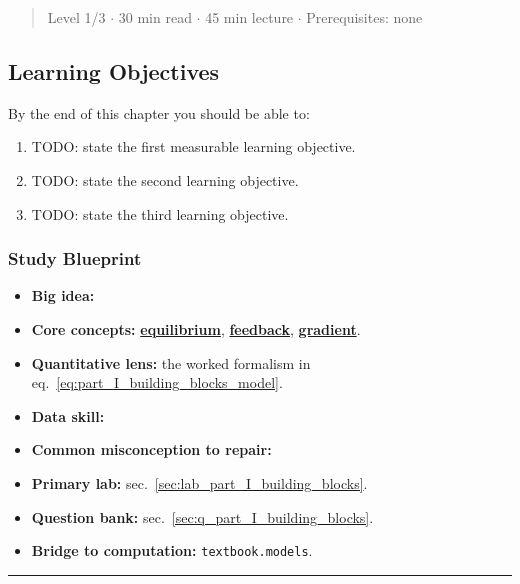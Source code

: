 \documentclass[
]{article}
\newcounter{none} %
\providecommand{\tightlist}{%
  \setlength{\itemsep}{0pt}\setlength{\parskip}{0pt}}
\theoremstyle{plain}
\theoremstyle{definition}
\begin{document}
\begin{quote}
Level 1/3 \texorpdfstring{\ensuremath{\cdot}}{.} 30 min read \texorpdfstring{\ensuremath{\cdot}}{.} 45 min lecture \texorpdfstring{\ensuremath{\cdot}}{.} Prerequisites: none
\end{quote}

\subsection{Learning Objectives}\label{learning-objectives-4}

By the end of this chapter you should be able to:

\begin{enumerate}
\def\labelenumi{\arabic{enumi}.}
\item
  TODO: state the first measurable learning objective.
\item
  TODO: state the second learning objective.
\item
  TODO: state the third learning objective.
\end{enumerate}

\subsubsection{Study Blueprint}\label{study-blueprint-4}

\begin{itemize}
\tightlist
\item
  \textbf{Big idea:}
\item
  \textbf{Core concepts:}
  \hyperref[gl:equilibrium]{\textbf{equilibrium}},
  \hyperref[gl:feedback]{\textbf{feedback}},
  \hyperref[gl:gradient]{\textbf{gradient}}.
\item
  \textbf{Quantitative lens:} the worked formalism in
  eq.~\ref{eq:part_I_building_blocks_model}.
\item
  \textbf{Data skill:}
\item
  \textbf{Common misconception to repair:}
\item
  \textbf{Primary lab:} sec.~\ref{sec:lab_part_I_building_blocks}.
\item
  \textbf{Question bank:} sec.~\ref{sec:q_part_I_building_blocks}.
\item
  \textbf{Bridge to computation:} \texttt{textbook.models}.
\end{itemize}

\begin{center}\rule{0.5\linewidth}{0.5pt}\end{center}
\end{document}
